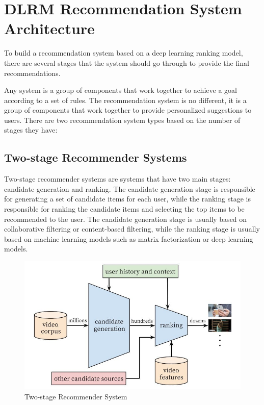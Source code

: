 

\section{DLRM Recommendation System Architecture}

To build a recommendation system based on a deep learning ranking model, there are several stages that the system should go through to provide the final recommendations.

Any system is a group of components that work together to achieve a goal according to a set of rules. The recommendation system is no different, it is a group of components that work together to provide personalized suggestions to users. There are two recommendation system types based on the number of stages they have:
\subsection{Two-stage Recommender Systems}
Two-stage recommender systems are systems that have two main stages: candidate generation and ranking. The candidate generation stage is responsible for generating a set of candidate items for each user, while the ranking stage is responsible for ranking the candidate items and selecting the top items to be recommended to the user. The candidate generation stage is usually based on collaborative filtering or content-based filtering, while the ranking stage is usually based on machine learning models such as matrix factorization or deep learning models.\cite{MultiStageRecSys}
\begin{figure}[H]
    \centering
    \includegraphics[width=1\textwidth]{assets/Two_stage_rec_sys.jpg}
    \caption{Two-stage Recommender System\cite{MultiStageRecSys}}
\end{figure}
